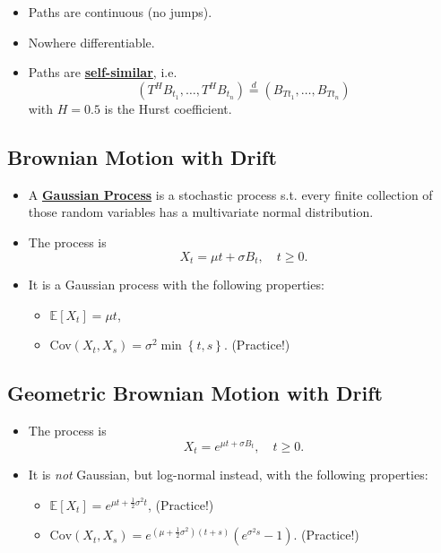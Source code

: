 \documentclass[twocolumn,landscape,10pt]{article}
\theoremstyle{definition}
\begin{document}
\begin{itemize}
    \item Paths are continuous (no jumps).
    \item Nowhere differentiable.
    \item Paths are \textbf{\underline{self-similar}}, i.e.\
        \[
            (T^HB_{t_1},\ldots,T^HB_{t_n})\stackrel{d}{=}(B_{Tt_1},\ldots,B_{Tt_n})
        \]
        with $H=0.5$ is the Hurst coefficient.
\end{itemize}

\subsection{Brownian Motion with Drift}

\begin{itemize}
    \item A \textbf{\underline{Gaussian Process}} is a stochastic process s.t.
        every finite collection of those random variables has a multivariate
        normal distribution.
    \item The process is
        \[
            X_t=\mu t+\sigma B_t,\quad t\ge 0.
        \]
    \item It is a Gaussian process with the following properties:
        \begin{itemize}
            \item $\mathbb{E}[X_t]=\mu t$,
            \item Cov$(X_t, X_s)=\sigma^2\min\left\{t,s\right\}$. (Practice!)
        \end{itemize}
\end{itemize}

\subsection{Geometric Brownian Motion with Drift}

\begin{itemize}
    \item The process is
        \[
            X_t=e^{\mu t+\sigma B_t},\quad t\ge 0.
        \]
    \item It is \emph{not} Gaussian, but log-normal instead, with the following
        properties:
        \begin{itemize}
            \item $\mathbb{E}[X_t]=e^{\mu t+\frac{1}{2}\sigma^2t}$, (Practice!)
            \item
                $\text{Cov}(X_t,X_s)=e^{\left(\mu+\frac{1}{2}\sigma^2\right)(t+s)}\left(e^{\sigma^2s}-1\right)$.
                (Practice!)
        \end{itemize}
\end{itemize}
\end{document}

